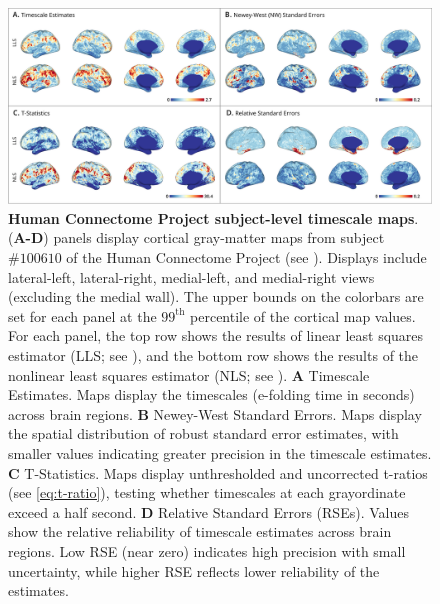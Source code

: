 \documentclass[latex/main.tex]{subfiles}
\begin{document}
\begin{figure}[H]
    \centering
    \includegraphics[width=1\textwidth]{latex/figures/fig04-hcp1.png} 
    \caption{
    \textbf{Human Connectome Project subject-level timescale maps}.
    (\textbf{A-D}) panels display cortical gray-matter maps from subject $\# 100610$ of the Human Connectome Project (see ). Displays include lateral-left, lateral-right, medial-left, and medial-right views (excluding the medial wall). The upper bounds on the colorbars are set for each panel at the $99^\text{th}$ percentile of the cortical map values. For each panel, the top row shows the results of linear least squares estimator (LLS; see ), and the bottom row shows the results of the nonlinear least squares estimator (NLS; see ). 
    \textbf{A} Timescale Estimates. Maps display the timescales (e-folding time in seconds) across brain regions. 
    \textbf{B} Newey-West Standard Errors. Maps display the spatial distribution of robust standard error estimates, with smaller values indicating greater precision in the timescale estimates. 
    \textbf{C} T-Statistics. Maps display unthresholded and uncorrected t-ratios (see \eqref{eq:t-ratio}), testing whether timescales at each grayordinate exceed a half second. 
    \textbf{D} Relative Standard Errors (RSEs). Values show the relative reliability of timescale estimates across brain regions. Low RSE (near zero) indicates high precision with small uncertainty, while higher RSE reflects lower reliability of the estimates.
    }
    \label{fig:map-hcp1}
\end{figure}
\end{document}
